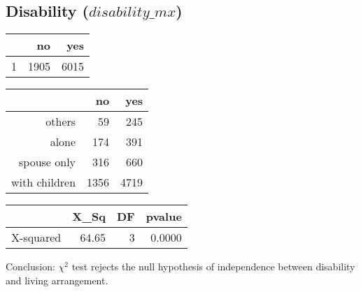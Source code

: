 \documentclass[11pt]{article}
\begin{document}
\subsection*{Disability ($disability\_mx$)}
\begin{table}[ht]
\centering
\begin{tabular}{rrr}
  \hline
 & no & yes \\ 
  \hline
1 & 1905 & 6015 \\ 
   \hline
\end{tabular}
\end{table}%
\begin{table}[ht]
\centering
\begin{tabular}{rrr}
  \hline
 & no & yes \\ 
  \hline
others &  59 & 245 \\ 
  alone & 174 & 391 \\ 
  spouse only & 316 & 660 \\ 
  with children & 1356 & 4719 \\ 
   \hline
\end{tabular}
\end{table}%
\begin{table}[ht]
\centering
\begin{tabular}{rrrr}
  \hline
 & X\_Sq & DF & pvalue \\ 
  \hline
X-squared & 64.65 & 3 & 0.0000 \\ 
   \hline
\end{tabular}
\end{table}Conclusion: $\chi^2$ test rejects the null hypothesis of independence between disability and living arrangement. 

\newpage
\end{document}
